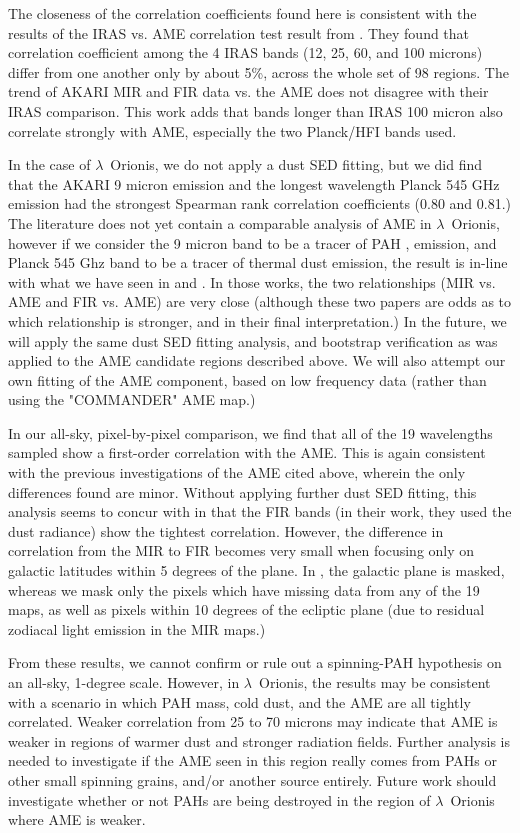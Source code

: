\documentclass[preprint2,longabstract]{aastex}
\begin{document}
	The closeness of the correlation coefficients found here is consistent with the results of the IRAS vs. AME correlation test result from \cite{planckXV}. They found that correlation coefficient among the 4 IRAS bands (12, 25, 60, and 100 microns) differ from one another only by about 5\%, across the whole set of 98 regions. The trend of AKARI MIR and FIR data vs. the AME does not disagree with their IRAS comparison. This work adds that bands longer than IRAS 100 micron also correlate strongly with AME, especially the two Planck/HFI bands used.


         In the case of $\lambda$~Orionis, we do not apply a dust SED fitting, but we did find that the AKARI 9 micron emission and the longest wavelength Planck 545 GHz emission had the strongest Spearman rank correlation coefficients (0.80 and 0.81.) The literature does not yet contain a comparable analysis of AME in $\lambda$~Orionis, however if we consider the 9 micron band to be a tracer of PAH , emission, and Planck 545 Ghz band to be a tracer of thermal dust emission, the result is in-line with what we have seen in \cite{ysard10b} and \cite{hensley16}. In those works, the two relationships (MIR vs. AME and FIR vs. AME) are very close (although these two papers are odds as to which relationship is stronger, and in their final interpretation.) In the future, we will apply the same dust SED fitting analysis, and bootstrap verification as was applied to the AME candidate regions described above. We will also attempt our own fitting of the AME component, based on low frequency data (rather than using the "COMMANDER" AME map.)

       In our all-sky, pixel-by-pixel comparison, we find that all of the 19 wavelengths sampled show a first-order correlation with the AME. This is again consistent with the previous investigations of the AME cited above, wherein the only differences found are minor. Without applying further dust SED fitting, this analysis seems to concur with \cite{hensley16} in that the FIR bands (in their work, they used the dust radiance) show the tightest correlation. However, the difference in correlation from the MIR to FIR becomes very small when focusing only on galactic latitudes within 5 degrees of the plane. In \cite{hensley16}, the galactic plane is masked, whereas we mask only the pixels which have missing data from any of the 19 maps, as well as pixels within 10 degrees of the ecliptic plane (due to residual zodiacal light emission in the MIR maps.)

     From these results, we cannot confirm or rule out a spinning-PAH hypothesis on an all-sky, 1-degree scale. However, in  $\lambda$~Orionis, the results may be consistent with a scenario in which PAH mass, cold dust, and the AME are all tightly correlated. Weaker correlation from 25 to 70 microns may indicate that AME is weaker in regions of warmer dust and stronger radiation fields. Further analysis is needed to investigate if the AME seen in this region really comes from PAHs or other small spinning grains, and/or another source entirely.  Future work should investigate whether or not PAHs are being destroyed in the region of $\lambda$~Orionis where AME is weaker.
\end{document}
